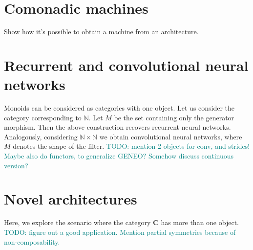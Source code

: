 \documentclass[12pt]{article}
\newcommand{\pietro}[1]{\textcolor{teal}{#1}}
\newcommand{\Cat}{{\mathbf{C}}}
\begin{document}


\section{Comonadic machines}

Show how it's possible to obtain a machine from an architecture.

\section{Recurrent and convolutional neural networks}

Monoids can be considered as categories with one object. Let us consider the category corresponding to $\mathbb N$. Let $M$ be the set containing only the generator morphism. Then the above construction recovers recurrent neural networks. Analogously, considering $\mathbb N \times \mathbb N$ we obtain convolutional neural networks, where $M$ denotes the shape of the filter.
\pietro{TODO: mention 2 objects for conv, and strides!}
\pietro{Maybe also do functors, to generalize GENEO? Somehow discuss continuous version?}

\section{Novel architectures}

Here, we explore the scenario where the category $\Cat$ has more than one object.
\pietro{TODO: figure out a good application.}
\pietro{Mention partial symmetries because of non-composability.}



\end{document}
